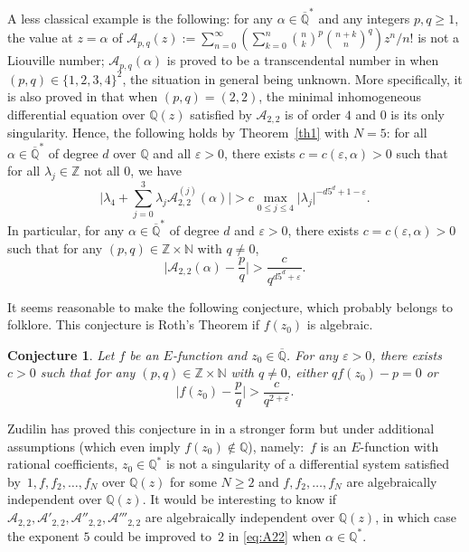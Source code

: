 \documentclass[11pt]{article}
\numberwithin{equation}{section}
\newcommand{\Efunction}{$E$\nobreakdash-func\-tion\xspace}
\newtheorem{conj}{Conjecture}
\theoremstyle{definition}
\newcommand{\Z}{\mathbb{Z}}
\newcommand{\Qbar}{\overline{\mathbb Q}}
\let\eps\varepsilon
\begin{document}
A less classical example is the following: for any $\alpha\in \Qbar^*$ and any integers $p,q\ge 1$, the value at $z=\alpha$ of
$\mathcal{A}_{p,q}(z):=\sum_{n=0}^\infty (\sum_{k=0}^n \binom{n}{k}^p\binom{n+k}{n}^q)z^n/n!$ is not a Liouville number; $\mathcal{A}_{p,q}(\alpha)$ is proved to be a transcendental number in \cite[\S 4.6]{BRS2} when $(p,q)\in \{1,2,3,4\}^2$, the situation in general being unknown. More specifically, it is also proved in \cite[\S 4.6, Table\,1]{BRS2} that when $(p,q)=(2,2)$, the minimal inhomogeneous differential equation over $\mathbb Q(z)$ satisfied by $\mathcal{A}_{2,2}$ is of order $4$ and 0 is its only singularity. Hence, the following holds by Theorem~\ref{th1} with $N=5$: for all $\alpha\in \Qbar^*$ of degree $d$ over $\mathbb Q$ and all $\varepsilon>0$, there exists $c=c(\varepsilon, \alpha)>0$ such that for all $\lambda_j\in \mathbb Z$ not all 0, we have
\[
\Big\vert \lambda_4+\sum_{j=0}^3 \lambda_j \mathcal{A}_{2,2}^{(j)}(\alpha) \Big\vert >c
\max_{0\le j\le 4}\vert \lambda_j\vert^{ -d5^d+1-\varepsilon}.
\]
In particular, for any $\alpha\in \Qbar^*$ of degree $d$ and $\eps>0$, there exists $c=c(\varepsilon, \alpha)>0$ such that for any $(p,q)\in\Z\times \mathbb N$ with $q\neq0$,
\begin{equation}\label{eq:A22}
\Big\vert \mathcal{A}_{2,2}(\alpha) -\frac{p}{q}\Big\vert >\frac{c}{q^{
d5^d+\varepsilon}}.
\end{equation}

It seems reasonable to make the following conjecture, which probably belongs to folklore.
This conjecture is Roth's Theorem if $f(z_0)$ is algebraic.
\begin{conj} \label{conjmu2}
Let $f$ be an \Efunction and $z_0\in\Qbar$. For any $\eps>0$, there exists $c>0$ such that for any $(p,q)\in\Z\times \mathbb N$ with $q\neq 0$, either $q f(z_0)-p=0 $ or\vspace*{-3pt}
\[
\Big| f(z_0)-\frac p q \Big| > \frac c {q^{2+\eps}}.
\]
\end{conj}
Zudilin has proved this conjecture in \cite{zudilin} in a stronger form but under additional assumptions (which even imply $f(z_0)\notin \mathbb Q$), namely:~$f$ is an \Efunction with ratio\-nal coefficients, $z_0\in \mathbb Q^*$ is not a singularity of a differential system satisfied by~$1, f, f_2, \ldots, f_N$ over $\mathbb Q(z)$ for some $N\ge 2$ and $f, f_2, \ldots, f_N$ are algebraically independent over $\mathbb Q(z)$. It would be interesting to know if $\mathcal{A}_{2,2}, \mathcal{A}'_{2,2}, \mathcal{A}''_{2,2}, \mathcal{A}'''_{2,2}$ are alge\-braically independent over $\mathbb Q(z)$, in which case the exponent $5$ could be improved to~$2$ in \eqref{eq:A22} when $\alpha\in \mathbb Q^*$.
\end{document}
